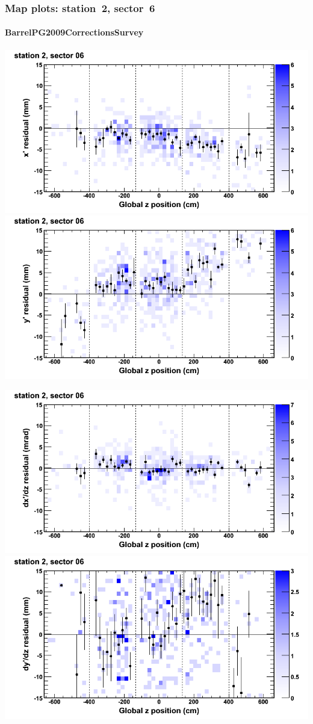 \documentclass[compress]{beamer}
\begin{document}
\begin{frame}
\frametitle{Map plots: station~2, sector~6}
\framesubtitle{BarrelPG2009CorrectionsSurvey}
\includegraphics[width=0.5\linewidth]{mapplots_01/DTvsz_st2sec06_x.png}
\includegraphics[width=0.5\linewidth]{mapplots_01/DTvsz_st2sec06_y.png}

\includegraphics[width=0.5\linewidth]{mapplots_01/DTvsz_st2sec06_dxdz.png}
\includegraphics[width=0.5\linewidth]{mapplots_01/DTvsz_st2sec06_dydz.png}
\end{frame}
\end{document}
